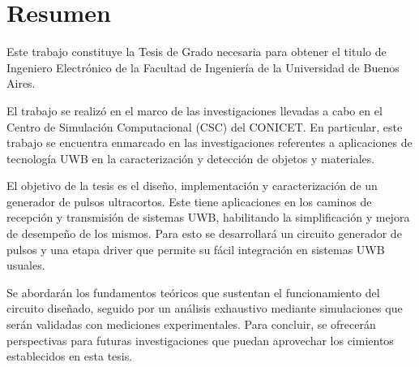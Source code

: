 \chapter*{Resumen}

Este trabajo constituye la Tesis de Grado necesaria para obtener el titulo de
Ingeniero Electrónico de la Facultad de Ingeniería de la Universidad de Buenos
Aires.

El trabajo se realizó en el marco de las investigaciones llevadas a cabo en el
Centro de Simulación Computacional (CSC) del CONICET. En particular, este
trabajo se encuentra enmarcado en las investigaciones referentes a aplicaciones
de tecnología UWB en la caracterización y detección de objetos y materiales.

El objetivo de la tesis es el diseño, implementación y caracterización de un
generador de pulsos ultracortos. Este tiene aplicaciones en los caminos de
recepción y transmisión de sistemas UWB, habilitando la simplificación y mejora
de desempeño de los mismos. Para esto se desarrollará un circuito generador de
pulsos y una etapa driver que permite su fácil integración en sistemas UWB
usuales.

Se abordarán los fundamentos teóricos que sustentan el funcionamiento del
circuito diseñado, seguido por un análisis exhaustivo mediante simulaciones que
serán validadas con mediciones experimentales. Para concluir, se ofrecerán
perspectivas para futuras investigaciones que puedan aprovechar los cimientos
establecidos en esta tesis.
